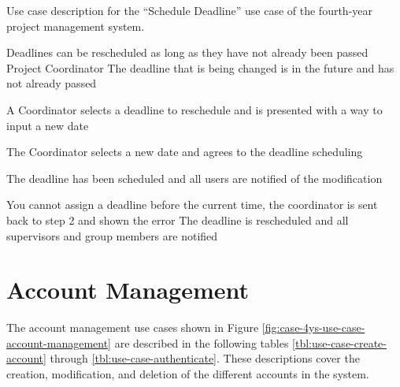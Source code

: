 \documentclass[document.tex]{subfiles}
\begin{document}
\begin{table}[!htbp]
  \centering
  \caption{Use case description for the ``Schedule Deadline'' use case of the fourth-year project management system.}
  \label{tbl:use-case-reschedule-deadline}

  \begin{usecase}
    Deadlines can be rescheduled as long as they have not already been passed
    Project Coordinator
    The deadline that is being changed is in the future and has not already passed
    \ucnormal
    \begin{ucenum}
      \item A Coordinator selects a deadline to reschedule and is presented with a way to input a new date
      \item The Coordinator selects a new date and agrees to the deadline scheduling
      \item The deadline has been scheduled and all users are notified of the modification
    \end{ucenum}
    You cannot assign a deadline before the current time, the coordinator is sent back to step 2 and shown the error
    The deadline is rescheduled and all supervisors and group members are notified
  \end{usecase}
\end{table}


\FloatBarrier



\section{Account Management}
\label{sec:account-management}

The account management use cases shown in Figure \ref{fig:case-4ys-use-case-account-management} are described in the following tables \ref{tbl:use-case-create-account} through \ref{tbl:use-case-authenticate}. These descriptions cover the creation, modification, and deletion of the different accounts in the system.
\end{document}
